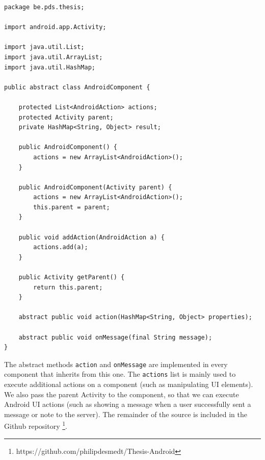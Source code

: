 \begin{lstlisting}[label=androidcomponent-class,caption=AndroidComponent class, captionpos=t]
package be.pds.thesis;

import android.app.Activity;

import java.util.List;
import java.util.ArrayList;
import java.util.HashMap;

public abstract class AndroidComponent {
	
	protected List<AndroidAction> actions;
	protected Activity parent;
	private HashMap<String, Object> result;

	public AndroidComponent() {
		actions = new ArrayList<AndroidAction>();
	}

	public AndroidComponent(Activity parent) {
		actions = new ArrayList<AndroidAction>();
		this.parent = parent;
	}

	public void addAction(AndroidAction a) {
		actions.add(a);
	}

	public Activity getParent() {
		return this.parent;
	}

	abstract public void action(HashMap<String, Object> properties);
	
	abstract public void onMessage(final String message);
}
\end{lstlisting}
The abstract methods \texttt{action} and \texttt{onMessage} are implemented in every component that inherits from this one. The \texttt{actions} list is mainly used to execute additional actions on a component (such as manipulating UI elements). We also pass the parent Activity to the component, so that we can execute Android UI actions (such as showing a message when a user successfully sent a message or note to the server). The remainder of the source is included in the Github repository \footnote{https://github.com/philipdesmedt/Thesis-Android}.
